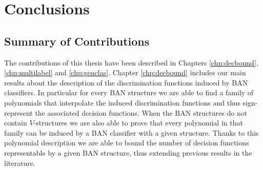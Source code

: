 \documentclass[11pt,a4paper, twoside]{book}
\newtheorem{theorem}{Theorem}[chapter]
\newtheorem{definition}{Definition}[chapter]
\newcommand{\Pp}{\operatorname{P}}
\newcommand{\Pq}{\operatorname{Q}}
\newcommand{\bx}{\mathbf{x}}
\newcommand{\bX}{\mathbf{X}}
\newcommand{\bchi}{\boldsymbol{\mathcal{X}}}
\begin{document}
%
%
%
%
%
%



\chapter{Conclusions}
\label{chp:conclusions}


\section{Summary of Contributions}

The contributions of this thesis have been described in Chapters \ref{chp:decbound}, \ref{chp:multilabel} and \ref{chp:genclas}.
Chapter \ref{chp:decbound} includes our main results about the description of the discrimination functions induced by BAN classifiers. In particular for every BAN structure we are able to find a family of polynomials that interpolate the induced discrimination functions and thus sign-represent the associated decision functions. When the BAN structures do not contain $V$-structures we are also able to prove that every polynomial in that family can be induced by a BAN classifier with a given structure. Thanks to this polynomial description we are able to bound the number of decision functions representable by a given BAN structure, thus extending previous results in the literature.
\end{document}
